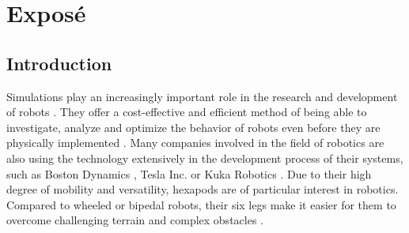 \chapter{Exposé}
\label{ch:expose}



\section{Introduction}
Simulations play an increasingly important role in the research and development of robots \parencite{afzal2020study}. 
They offer a cost-effective and efficient method of being able to investigate, analyze and optimize the behavior of robots even before they are physically implemented \parencite{en2019analysis}. 
Many companies involved in the field of robotics are also using the technology extensively in the development process of their systems, such as Boston Dynamics \parencite{BostonDynamicsSimulation}, Tesla Inc. \parencite{TeslaAiDay2022} or Kuka Robotics \parencite{KukaSim}.
Due to their high degree of mobility and versatility, hexapods are of particular interest in robotics. 
Compared to wheeled or bipedal robots, their six legs make it easier for them to overcome challenging terrain and complex obstacles \parencite{barai2013smart, atifystructure}.

